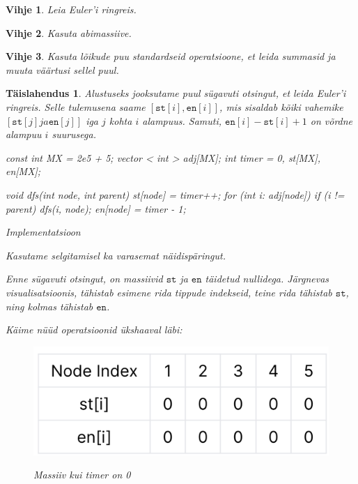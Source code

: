 \documentclass{trkut}
\newtheorem*{vihje}{Vihje}
\newtheorem*{solution}{Täislahendus}
\begin{document}
\begin{vihje}
Leia Euler'i ringreis.    
\end{vihje}

\begin{vihje}
Kasuta abimassiive.
\end{vihje}

\begin{vihje}
Kasuta lõikude puu standardseid operatsioone, et leida summasid ja muuta väärtusi sellel puul.
\end{vihje}

\begin{solution}
Alustuseks jooksutame puul sügavuti otsingut, et leida Euler'i ringreis.
Selle tulemusena saame $[\texttt{st}[i], \texttt{en}[i]]$, mis sisaldab kõiki vahemike $[\texttt{st}[j] ja \texttt{en}[j]]$ iga $j$ kohta $i$ alampuus. Samuti, $\texttt{en}[i]-\texttt{st}[i]+1$ on võrdne alampuu $i$ suurusega.
\begin{cclol}
const int MX = 2e5 + 5;
vector < int > adj[MX];
int timer = 0, st[MX], en[MX];

void dfs(int node, int parent) {
  st[node] = timer++;
  for (int i: adj[node]) {
    if (i != parent) {
      dfs(i, node);
    }
  }
  en[node] = timer - 1;
}
\end{cclol}
\begin{kk}[H]%
    \caption{Implementatsioon}%
    \label{EMaxx}%
    \end{kk}
    
Kasutame selgitamisel ka varasemat näidispäringut.

Enne sügavuti otsingut, on massiivid $\texttt{st}$ ja $\texttt{en}$ täidetud nullidega. 
Järgnevas visualisatsioonis, tähistab esimene rida tippude indekseid, teine rida tähistab $\texttt{st}$, ning kolmas tähistab $\texttt{en}$.

Käime nüüd operatsioonid ükshaaval läbi:

\begin{figure}[H]%
    \includegraphics[width=12cm]{first.jpeg}%
    \caption{Massiiv kui timer on 0}%
    \label{joonis}%
\end{figure}


\end{solution}
\end{document}
